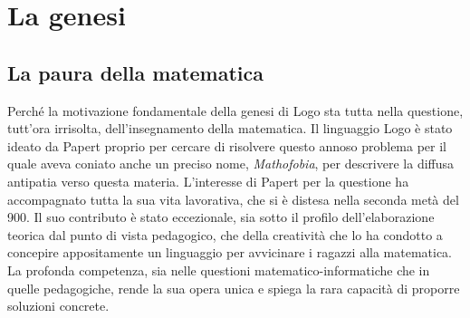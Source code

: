 \chapter{La genesi} \label{cap:papert}

\section{La paura della matematica}

Perché la motivazione fondamentale della genesi di Logo sta tutta nella questione, tutt'ora irrisolta, dell'insegnamento della matematica. Il linguaggio Logo è stato ideato da Papert proprio per cercare di risolvere questo annoso problema per il quale aveva coniato anche un preciso nome, \textit{Mathofobia}, per descrivere la diffusa antipatia verso questa materia. L'interesse di Papert per la questione ha accompagnato tutta la sua vita lavorativa, che si è distesa nella seconda metà del 900. Il suo contributo è stato eccezionale, sia sotto il profilo dell'elaborazione teorica dal punto di vista pedagogico, che della creatività che lo ha condotto a concepire appositamente un linguaggio per avvicinare i ragazzi alla matematica. La profonda competenza, sia nelle questioni matematico-informatiche che in quelle pedagogiche, rende la sua opera unica e spiega la rara capacità di proporre soluzioni concrete. 

